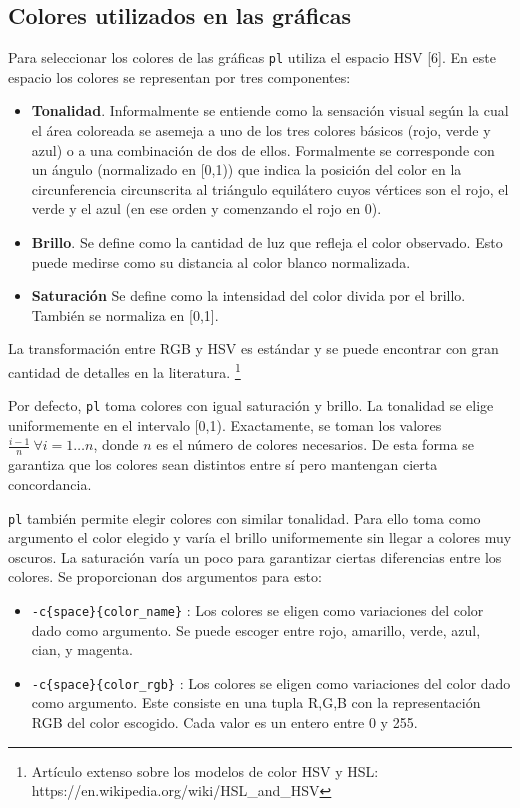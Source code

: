 \documentclass{article}
\begin{document}
	\subsection{Colores utilizados en las gráficas}
		
		Para seleccionar los colores de las gráficas \texttt{pl} utiliza el espacio HSV [6]. En este espacio los colores se representan por tres componentes:

		\begin{itemize}
			\item \textbf{Tonalidad}. Informalmente se entiende como la sensación visual según la cual el área coloreada se asemeja a uno de los tres colores básicos (rojo, verde y azul) o a una combinación de dos de ellos. Formalmente se corresponde con un ángulo (normalizado en [0,1)) que indica la posición del color en la circunferencia circunscrita al triángulo equilátero cuyos vértices son el rojo, el verde y el azul (en ese orden y comenzando el rojo en 0).

			\item \textbf{Brillo}. Se define como la cantidad de luz que refleja el color observado. Esto puede medirse como su distancia al color blanco normalizada.

			\item \textbf{Saturación} Se define como la intensidad del color divida por el brillo. También se normaliza en [0,1].
		\end{itemize}

		La transformación entre RGB y HSV es estándar y se puede encontrar con gran cantidad de detalles en la literatura. \footnote{Artículo extenso sobre los modelos de color HSV y HSL: https://en.wikipedia.org/wiki/HSL\_and\_HSV}

		Por defecto, \texttt{pl} toma colores con igual saturación y brillo. La tonalidad se elige uniformemente en el intervalo [0,1). Exactamente, se toman los valores $\frac{i-1}{n} \ \forall i = 1 \ldots n$, donde $n$ es el número de colores necesarios. De esta forma se garantiza que los colores sean distintos entre sí pero mantengan cierta concordancia.

		\texttt{pl} también permite elegir colores con similar tonalidad. Para ello toma como argumento el color elegido y varía el brillo uniformemente sin llegar a colores muy oscuros. La saturación varía un poco para garantizar ciertas diferencias entre los colores. Se proporcionan dos argumentos para esto:

		\begin{itemize}
			\item \texttt{-c\{space\}\{color\_name\}} : Los colores se eligen como variaciones del color dado como argumento. Se puede escoger entre rojo, amarillo, verde, azul, cian, y magenta.
		
			\item \texttt{-c\{space\}\{color\_rgb\}} : Los colores se eligen como variaciones del color dado como argumento. Este consiste en una tupla R,G,B con la representación RGB del color escogido. Cada valor es un entero entre 0 y 255.
		\end{itemize}		
\end{document}
